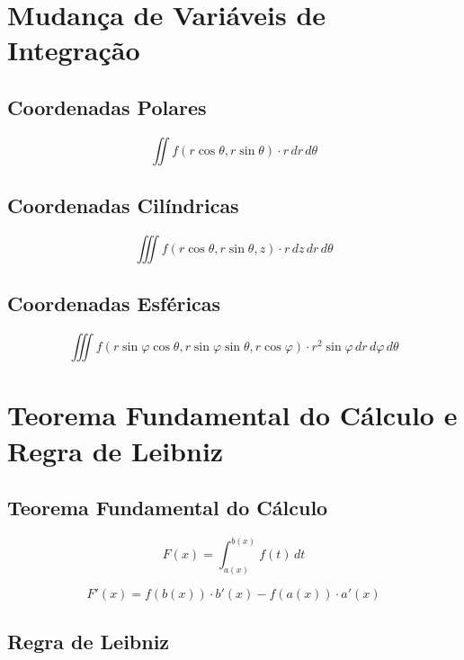 \documentclass[11pt, a4paper]{article}
\begin{document}
\section{Mudança de Variáveis de Integração}

\subsection{Coordenadas Polares}

\begin{equation*}
    \iint f(r\cos\theta, r\sin\theta) \cdot r\,dr\,d\theta
\end{equation*}

\subsection{Coordenadas Cilíndricas}

\begin{equation*}
    \iiint f(r\cos\theta, r\sin\theta, z) \cdot r\,dz\,dr\,d\theta
\end{equation*}

\subsection{Coordenadas Esféricas}

\begin{equation*}
    \iiint f(r\sin\varphi\cos\theta, r\sin\varphi\sin\theta, r\cos\varphi) \cdot r^2\sin\varphi\,dr\,d\varphi\,d\theta
\end{equation*}

\section{Teorema Fundamental do Cálculo e Regra de Leibniz}

\subsection{Teorema Fundamental do Cálculo}

\begin{equation*}
    F(x) = \int_{a(x)}^{b(x)} f(t) \, dt
\end{equation*}

\begin{equation*}
    F'(x) = f\left(b(x)\right) \cdot b'(x) - f\left(a(x)\right) \cdot a'(x)
\end{equation*}

\subsection{Regra de Leibniz}
\end{document}
